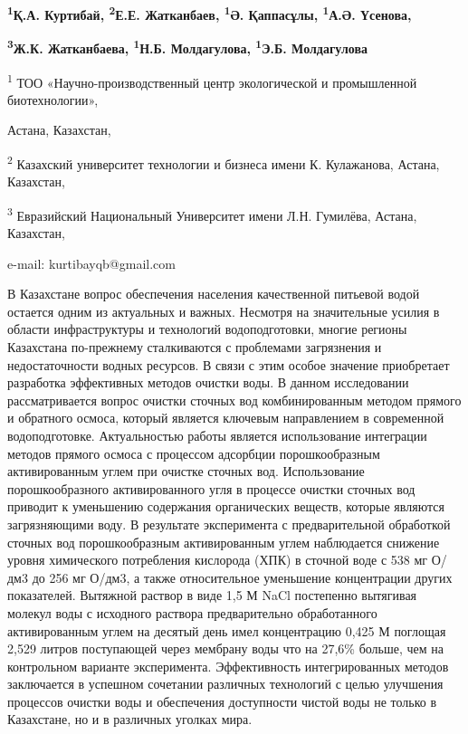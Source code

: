 {\bfseries \textsuperscript{1}Қ.А. Куртибай, \textsuperscript{2}Е.Е.
Жатканбаев, \textsuperscript{1}Ә. Қаппасұлы, \textsuperscript{1}А.Ә.
Үсенова,}

{\bfseries \textsuperscript{3}Ж.К. Жатканбаева, \textsuperscript{1}Н.Б.
Молдагулова, \textsuperscript{1}Э.Б. Молдагулова}

\textsuperscript{1} ТОО «Научно-производственный центр экологической и
промышленной биотехнологии»,

Астана, Казахстан,

\textsuperscript{2} Казахский университет технологии и бизнеса имени К.
Кулажанова, Астана, Казахстан,

\textsuperscript{3} Евразийский Национальный Университет имени Л.Н.
Гумилёва, Астана, Казахстан,

e-mail: kurtibayqb@gmail.com

В Казахстане вопрос обеспечения населения качественной питьевой водой
остается одним из актуальных и важных. Несмотря на значительные усилия в
области инфраструктуры и технологий водоподготовки, многие регионы
Казахстана по-прежнему сталкиваются с проблемами загрязнения и
недостаточности водных ресурсов. В связи с этим особое значение
приобретает разработка эффективных методов очистки воды. В данном
исследовании рассматривается вопрос очистки сточных вод комбинированным
методом прямого и обратного осмоса, который является ключевым
направлением в современной водоподготовке. Актуальностью работы является
использование интеграции методов прямого осмоса с процессом адсорбции
порошкообразным активированным углем при очистке сточных вод.
Использование порошкообразного активированного угля в процессе очистки
сточных вод приводит к уменьшению содержания органических веществ,
которые являются загрязняющими воду. В результате эксперимента с
предварительной обработкой сточных вод порошкообразным активированным
углем наблюдается снижение уровня химического потребления кислорода
(ХПК) в сточной воде с 538 мг О/дм3 до 256 мг О/дм3, а также
относительное уменьшение концентрации других показателей. Вытяжной
раствор в виде 1,5 М NaCl постепенно вытягивая молекул воды с исходного
раствора предварительно обработанного активированным углем на десятый
день имел концентрацию 0,425 М поглощая 2,529 литров поступающей через
мембрану воды что на 27,6\% больше, чем на контрольном варианте
эксперимента. Эффективность интегрированных методов заключается в
успешном сочетании различных технологий с целью улучшения процессов
очистки воды и обеспечения доступности чистой воды не только в
Казахстане, но и в различных уголках мира.

